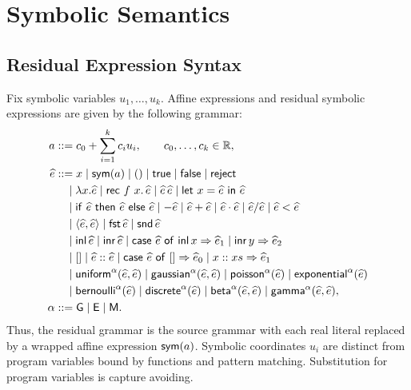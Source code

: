 \section{Symbolic Semantics}
\label{sec:appendix-symbolic-definitions}

\subsection{Residual Expression Syntax}

\begin{definition}\label{sec:appendix-symbolic-definitions-residual-syntax}
Fix symbolic variables $u_1,\ldots,u_k$. Affine expressions and residual
symbolic expressions are given by the following grammar:
\[
\begin{aligned}
  a
  &::=
  c_0+\sum_{i=1}^{k}c_i u_i,
  \qquad c_0,\ldots,c_k\in\mathbb{R},
  \\
  \widehat e
  &::=
  x
  \mid\mathsf{sym}(a)
  \mid ()
  \mid \mathsf{true}
  \mid \mathsf{false}
  \mid \mathsf{reject}
  \\
  &\quad\mid
  \lambda x.\widehat e
  \mid \mathsf{rec}\ f\ x.\,\widehat e
  \mid \widehat e\,\widehat e
  \mid \mathsf{let}\ x=\widehat e\ \mathsf{in}\ \widehat e
  \\
  &\quad\mid
  \mathsf{if}\ \widehat e\ \mathsf{then}\ \widehat e\ \mathsf{else}\ \widehat e
  \mid -\widehat e
  \mid \widehat e+\widehat e
  \mid \widehat e\cdot\widehat e
  \mid \widehat e/\widehat e
  \mid \widehat e<\widehat e
  \\
  &\quad\mid
  \langle\widehat e,\widehat e\rangle
  \mid \mathsf{fst}\,\widehat e
  \mid \mathsf{snd}\,\widehat e
  \\
  &\quad\mid
  \mathsf{inl}\,\widehat e
  \mid \mathsf{inr}\,\widehat e
  \mid \mathsf{case}\ \widehat e\ \mathsf{of}\ \mathsf{inl}\,x\Rightarrow \widehat e_1\mid\mathsf{inr}\,y\Rightarrow \widehat e_2
  \\
  &\quad\mid
  []
  \mid \widehat e::\widehat e
  \mid \mathsf{case}\ \widehat e\ \mathsf{of}\ []\Rightarrow \widehat e_0\mid x::xs\Rightarrow \widehat e_1
  \\
  &\quad\mid
  \mathsf{uniform}^{\alpha}(\widehat e,\widehat e)
  \mid \mathsf{gaussian}^{\alpha}(\widehat e,\widehat e)
  \mid \mathsf{poisson}^{\alpha}(\widehat e)
  \mid \mathsf{exponential}^{\alpha}(\widehat e)
  \\
  &\quad\mid
  \mathsf{bernoulli}^{\alpha}(\widehat e)
  \mid \mathsf{discrete}^{\alpha}(\widehat e)
  \mid \mathsf{beta}^{\alpha}(\widehat e,\widehat e)
  \mid \mathsf{gamma}^{\alpha}(\widehat e,\widehat e),
  \\
  \alpha
  &::=\mathsf{G}\mid\mathsf{E}\mid\mathsf{M}.
\end{aligned}
\]
Thus, the residual grammar is the source grammar with each real literal
replaced by a wrapped affine expression $\mathsf{sym}(a)$. Symbolic coordinates $u_i$
are distinct from program variables bound by functions and pattern matching.
Substitution for program variables is capture avoiding.
\end{definition}


